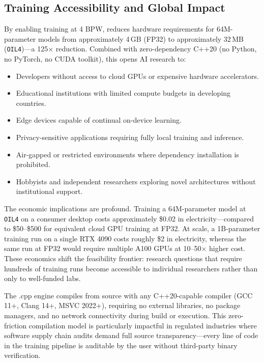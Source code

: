 \subsection{Training Accessibility and Global Impact}

By enabling training at 4 BPW, \MYTHOS{} reduces hardware requirements for 64M-parameter models from approximately 4\,GB (FP32) to approximately 32\,MB (\texttt{OIL4})---a 125$\times$ reduction. Combined with zero-dependency C++20 (no Python, no PyTorch, no CUDA toolkit), this opens AI research to:

\begin{itemize}
    \item Developers without access to cloud GPUs or expensive hardware accelerators.
    \item Educational institutions with limited compute budgets in developing countries.
    \item Edge devices capable of continual on-device learning.
    \item Privacy-sensitive applications requiring fully local training and inference.
    \item Air-gapped or restricted environments where dependency installation is prohibited.
    \item Hobbyists and independent researchers exploring novel architectures without institutional support.
\end{itemize}

The economic implications are profound. Training a 64M-parameter model at \texttt{OIL4} on a consumer desktop costs approximately \$0.02 in electricity---compared to \$50--\$500 for equivalent cloud GPU training at FP32. At scale, a 1B-parameter \OIL{} training run on a single RTX 4090 costs roughly \$2 in electricity, whereas the same run at FP32 would require multiple A100 GPUs at 10--50$\times$ higher cost. These economics shift the feasibility frontier: research questions that require hundreds of training runs become accessible to individual researchers rather than only to well-funded labs.

The \MYTHOS{}.cpp engine compiles from source with any C++20-capable compiler (GCC 11+, Clang 14+, MSVC 2022+), requiring no external libraries, no package managers, and no network connectivity during build or execution. This zero-friction compilation model is particularly impactful in regulated industries where software supply chain audits demand full source transparency---every line of code in the training pipeline is auditable by the user without third-party binary verification.


